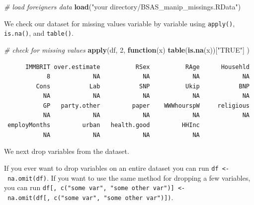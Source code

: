 \documentclass[]{article}
\newenvironment{Shaded}{\begin{snugshade}}{\end{snugshade}}
\newcommand{\CommentTok}[1]{\textcolor[rgb]{0.56,0.35,0.01}{\textit{#1}}}
\newcommand{\ControlFlowTok}[1]{\textcolor[rgb]{0.13,0.29,0.53}{\textbf{#1}}}
\newcommand{\DecValTok}[1]{\textcolor[rgb]{0.00,0.00,0.81}{#1}}
\newcommand{\KeywordTok}[1]{\textcolor[rgb]{0.13,0.29,0.53}{\textbf{#1}}}
\newcommand{\NormalTok}[1]{#1}
\newcommand{\OperatorTok}[1]{\textcolor[rgb]{0.81,0.36,0.00}{\textbf{#1}}}
\newcommand{\StringTok}[1]{\textcolor[rgb]{0.31,0.60,0.02}{#1}}
\begin{document}
\begin{Shaded}
\begin{Highlighting}[]
\CommentTok{# load foreigners data}
\KeywordTok{load}\NormalTok{(}\StringTok{"your directory/BSAS_manip_missings.RData"}\NormalTok{)}
\end{Highlighting}
\end{Shaded}

We check our dataset for missing values variable by variable using \texttt{apply()}, \texttt{is.na()}, and \texttt{table()}.

\begin{Shaded}
\begin{Highlighting}[]
\CommentTok{# check for missing values}
\KeywordTok{apply}\NormalTok{(df, }\DecValTok{2}\NormalTok{, }\ControlFlowTok{function}\NormalTok{(x) }\KeywordTok{table}\NormalTok{(}\KeywordTok{is.na}\NormalTok{(x))[}\StringTok{"TRUE"}\NormalTok{] )}
\end{Highlighting}
\end{Shaded}

\begin{verbatim}
      IMMBRIT over.estimate          RSex          RAge      Househld 
            8            NA            NA            NA            NA 
         Cons           Lab           SNP          Ukip           BNP 
           NA            NA            NA            NA            NA 
           GP   party.other         paper    WWWhourspW     religious 
           NA            NA            NA            NA            NA 
 employMonths         urban   health.good         HHInc 
           NA            NA            NA            NA 
\end{verbatim}

We next drop variables from the dataset.

\begin{Shaded}
\end{Shaded}

If you ever want to drop variables on an entire dataset you can run \texttt{df\ \textless{}-\ na.omit(df)}. If you want to use the same method for dropping a few variables, you can run \texttt{df{[},\ c("some\ var",\ "some\ other\ var"){]}\ \textless{}-\ na.omit(df{[},\ c("some\ var",\ "some\ other\ var"){]})}.
\end{document}
